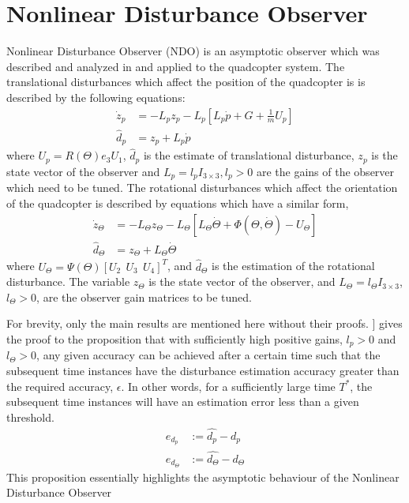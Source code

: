\documentclass[letterpaper%
, twoside%
, 12pt%
,memoire%
, english%
,creativecommons,hyperref%
]{thETS}
\begin{document}
\section{Nonlinear Disturbance Observer} \label{Sec:NDO}
Nonlinear Disturbance Observer (NDO) is an asymptotic observer which was described and analyzed in \citep{bash2019analysis} and applied to the quadcopter system. The translational disturbances which affect the position of the quadcopter is is described by the following equations: 
\begin{equation}
\begin{split}
\label{eqn:NDO1}
\dot{z}_p &= -L_pz_p - L_p[L_p\dot{p}+G+\frac{1}{m}U_p ]\\
\hat{d}_p&=z_p + L_p\dot{p}
\end{split}
\end{equation}
where $U_p=R(\Theta) e_3 U_1$, $\widehat{d}_p$ is the estimate of translational disturbance,  $z_p$ is the state vector of the observer and $L_p=l_p I_{3 \times 3}, l_p >0$ are the gains of the observer which need to be tuned. 
The rotational disturbances which affect the orientation of the quadcopter is described by equations which have a similar form, 
\begin{equation}
\begin{split}
\label{eqn:NDO2}
\dot{z}_\Theta &= -L_\Theta z_\Theta - L_\Theta[L_\Theta\dot{\Theta}+\Phi(\Theta,\dot{\Theta}) - U_\Theta] \\
\hat{d}_\Theta&=z_\Theta + L_\Theta\dot{\Theta}
\end{split}
\end{equation}
where $U_\Theta=\Psi(\Theta)[U_2\ \ U_3\ \ U_4]^T$, and $\widehat{d}_\Theta$ is the estimation of the rotational disturbance. The variable $z_\Theta$ is the state vector of the observer, and $L_\Theta=l_\Theta I_{3 \times 3}$,  $l_\Theta >0$, are the observer gain matrices to be tuned.

For brevity, only the main results are mentioned here without their proofs. \citep{RN114}] gives the proof to the proposition that with sufficiently high positive gains, $l_p>0$ and $l_\Theta>0$, any given accuracy can be achieved after a certain time such that the subsequent time instances have the disturbance estimation accuracy greater than the required accuracy, $\epsilon$. In other words, for a sufficiently large time $T^*$, the subsequent time instances will have an estimation error less than a given threshold.
\begin{align} \label{eqn:NDO3}
e_{d_p} &:=\hat{d_p} - d_p \\
e_{d_\Theta} &:=\hat{d_\Theta}-d_\Theta
\end{align}
This proposition essentially highlights the asymptotic behaviour of the Nonlinear Disturbance Observer
\end{document}
